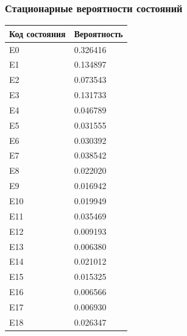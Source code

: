 \subsubsection{Стационарные вероятности состояний}

\begin{tabular}{|l|l|}
\hline
Код состояния & Вероятность \\ \hline
E0 & 0.326416 \\ \hline
E1 & 0.134897 \\ \hline
E2 & 0.073543 \\ \hline
E3 & 0.131733 \\ \hline
E4 & 0.046789 \\ \hline
E5 & 0.031555 \\ \hline
E6 & 0.030392 \\ \hline
E7 & 0.038542 \\ \hline
E8 & 0.022020 \\ \hline
E9 & 0.016942 \\ \hline
E10 & 0.019949 \\ \hline
E11 & 0.035469 \\ \hline
E12 & 0.009193 \\ \hline
E13 & 0.006380 \\ \hline
E14 & 0.021012 \\ \hline
E15 & 0.015325 \\ \hline
E16 & 0.006566 \\ \hline
E17 & 0.006930 \\ \hline
E18 & 0.026347 \\ \hline
\end{tabular}

